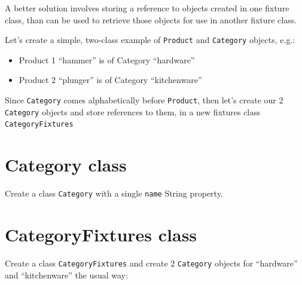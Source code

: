 \documentclass[a4paperpaper,openright]{book}
\providecommand{\tightlist}{%
  \setlength{\itemsep}{0pt}\setlength{\parskip}{0pt}}
\begin{document}
A better solution involves storing a reference to objects created in one
fixture class, than can be used to retrieve those objects for use in
another fixture class.

Let's create a simple, two-class example of \texttt{Product} and
\texttt{Category} objects, e.g.:

\begin{itemize}
\tightlist
\item
  Product 1 ``hammer'' is of Category ``hardware''
\item
  Product 2 ``plunger'' is of Category ``kitchenware''
\end{itemize}

Since \texttt{Category} comes alphabetically before \texttt{Product},
then let's create our 2 \texttt{Category} objects and store references
to them, in a new fixtures class \texttt{CategoryFixtures}

\hypertarget{category-class}{%
\section{Category class}\label{category-class}}

Create a class \texttt{Category} with a single \texttt{name} String
property.

\hypertarget{categoryfixtures-class}{%
\section{CategoryFixtures class}\label{categoryfixtures-class}}

Create a class \texttt{CategoryFixtures} and create 2 \texttt{Category}
objects for ``hardware'' and ``kitchenware'' the usual way:
\end{document}
